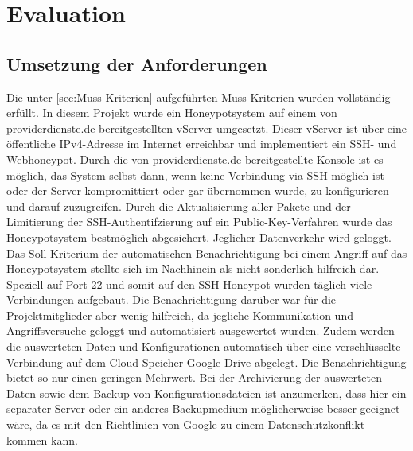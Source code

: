 \chapter{Evaluation}
\label{ch:Evaluation}

\section{Umsetzung der Anforderungen}
\label{sec:Umsetzung der Anforderungen}

Die unter \ref{sec:Muss-Kriterien} aufgeführten Muss-Kriterien wurden vollständig erfüllt. In diesem Projekt wurde ein Honeypotsystem auf einem von providerdienste.de bereitgestellten vServer umgesetzt. Dieser vServer ist über eine öffentliche IPv4-Adresse im Internet erreichbar und implementiert ein SSH- und Webhoneypot. Durch die von providerdienste.de bereitgestellte Konsole ist es möglich, das System selbst dann, wenn keine Verbindung via SSH möglich ist oder der Server kompromittiert oder gar übernommen wurde, zu konfigurieren und darauf zuzugreifen. Durch die Aktualisierung aller Pakete und der Limitierung der SSH-Authentifzierung auf ein Public-Key-Verfahren wurde das Honeypotsystem bestmöglich abgesichert. Jeglicher Datenverkehr wird geloggt.\\

Das Soll-Kriterium der automatischen Benachrichtigung bei einem Angriff auf das Honeypotsystem stellte sich im Nachhinein als nicht sonderlich hilfreich dar. Speziell auf Port 22 und somit auf den SSH-Honeypot wurden täglich viele Verbindungen aufgebaut. Die Benachrichtigung darüber war für die Projektmitglieder aber wenig hilfreich, da jegliche Kommunikation und Angriffsversuche geloggt und automatisiert ausgewertet wurden. Zudem werden die auswerteten Daten und Konfigurationen automatisch über eine verschlüsselte Verbindung auf dem Cloud-Speicher Google Drive abgelegt. Die Benachrichtigung bietet so nur einen geringen Mehrwert. Bei der Archivierung der auswerteten Daten sowie dem Backup von Konfigurationsdateien ist anzumerken, dass hier ein separater Server oder ein anderes Backupmedium möglicherweise besser geeignet wäre, da es mit den Richtlinien von Google zu einem Datenschutzkonflikt kommen kann.\\

